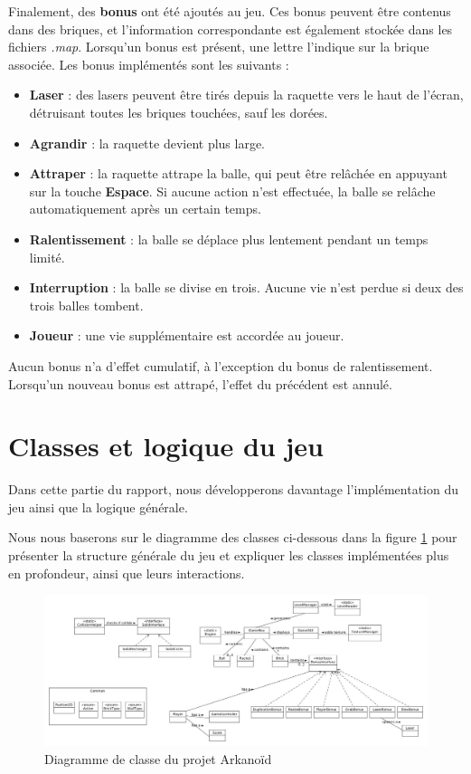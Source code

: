 \documentclass{article}
\begin{document}
\noindent Finalement, des \textbf{bonus} ont été ajoutés au jeu. Ces bonus peuvent être contenus dans des briques, et l’information correspondante est également stockée dans les fichiers \textit{.map}. Lorsqu’un bonus est présent, une lettre l’indique sur la brique associée. Les bonus implémentés sont les suivants : 
\begin{itemize}
    \item \textbf{Laser} : des lasers peuvent être tirés depuis la raquette vers le haut de l’écran, détruisant toutes les briques touchées, sauf les dorées. 
    \item \textbf{Agrandir} : la raquette devient plus large.
    \item \textbf{Attraper} : la raquette attrape la balle, qui peut être relâchée en appuyant sur la touche \textbf{Espace}. Si aucune action n’est effectuée, la balle se relâche automatiquement après un certain temps.
    \item \textbf{Ralentissement} : la balle se déplace plus lentement pendant un temps limité.
    \item \textbf{Interruption} : la balle se divise en trois. Aucune vie n’est perdue si deux des trois balles tombent.
    \item \textbf{Joueur} : une vie supplémentaire est accordée au joueur.
\end{itemize}

\noindent Aucun bonus n’a d’effet cumulatif, à l’exception du bonus de ralentissement. Lorsqu’un nouveau bonus est attrapé, l’effet du précédent est annulé.



\section{Classes et logique du jeu}

\noindent Dans cette partie du rapport, nous développerons davantage l'implémentation du jeu ainsi que la logique générale. 

\noindent Nous nous baserons sur le diagramme des classes ci-dessous dans la figure \ref{fig:cdgm} pour présenter la structure générale du jeu et expliquer les classes implémentées plus en profondeur, ainsi que leurs interactions.

\vspace{1em}

\begin{figure}[H]
    \hspace{-1.5cm} %
    \includegraphics[width=1.2\textwidth]{src/class_diagram.jpg}
    \caption{Diagramme de classe du projet Arkanoïd}
    \label{fig:cdgm}
\end{figure}
\end{document}
